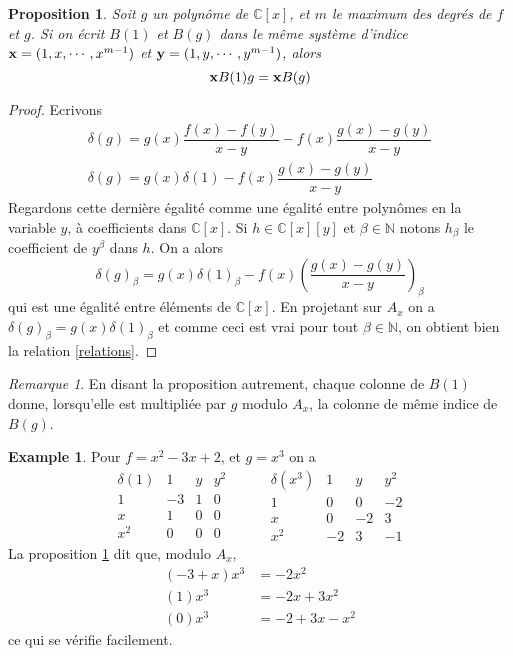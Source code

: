 \documentclass{article}
\theoremstyle{plain}%
\newtheorem{prop}{Proposition}
\theoremstyle{definition}
\newtheorem{exmp}{Example}
\theoremstyle{remark}
\newtheorem*{rem}{Remarque}
\newcommand{\N}{\mathbb{N}}
\newcommand{\C}{\mathbb{C}}
\begin{document}
\begin{prop}
\label{relations_prop}
Soit $g$ un polynôme de $\C[x]$, et $m$ le maximum des degrés de $f$ et $g$. Si on écrit $B(1)$ et $B(g)$ dans le même système d'indice $\bold{x} = (1, x,\cdots, x^{m-1})$ et $\bold{y} = (1, y,\cdots, y^{m-1})$, alors
\begin{equation}
\label{relations}
	\bold{x}B(1)g = \bold{x}B(g)
\end{equation}
\end{prop}
\begin{proof}
Ecrivons
\begin{align} \nonumber 
	\delta(g) = g(x)\dfrac{f(x)-f(y)}{x-y} - f(x)\dfrac{g(x)-g(y)}{x-y} \\ \nonumber 
	\delta(g) = g(x)\delta(1) - f(x)\dfrac{g(x)-g(y)}{x-y} 
\end{align}
Regardons cette dernière égalité comme une égalité entre polynômes en la variable $y$, à coefficients dans $\C[x]$. Si $h\in \C[x][y]$ et $\beta\in\N$ notons $h_\beta$ le coefficient de $y^\beta$ dans $h$. On a alors 
$$\delta(g)_\beta = g(x)\delta(1)_\beta - f(x)(\dfrac{g(x)-g(y)}{x-y})_\beta $$
qui est une égalité entre éléments de $\C[x]$. En projetant sur $A_x$ on a
$\delta(g)_\beta = g(x)\delta(1)_\beta$
et comme ceci est vrai pour tout $\beta\in\N$, on obtient bien la relation \ref{relations}.
\end{proof}
\begin{rem}
En disant la  proposition autrement, chaque colonne de $B(1)$ donne, lorsqu'elle est multipliée par $g$ modulo $A_x$, la colonne de même indice de $B(g)$.
\end{rem}
\begin{exmp}
Pour $f = x^2 - 3x + 2$, et $g = x^3$ on a
$$
\begin{array}{c|ccc}
\delta(1) & 1 & y & y^2\\
\hline
1 & -3 & 1 & 0\\
x & 1 & 0 & 0\\
x^2 & 0 & 0 & 0
\end{array}
\hspace{1cm}
\begin{array}{c|ccc}
\delta(x^3) & 1 & y & y^2\\
\hline
1 & 0 & 0 & -2\\
x & 0 & -2 & 3\\
x^2 & -2 & 3 & -1
\end{array}
$$
La proposition \ref{relations_prop} dit que, modulo $A_x$, 
\begin{align} \nonumber 
	(-3 + x)x^3 &= -2x^2 \\ \nonumber 
	(1)x^3 &= -2x + 3x^2 \\ \nonumber 
	(0)x^3 &= -2 + 3x - x^2
\end{align}
ce qui se vérifie facilement.
\end{exmp}
\end{document}
